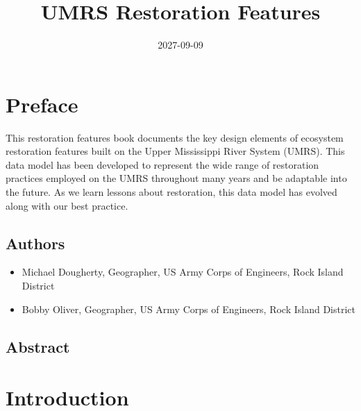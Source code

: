 \documentclass[
  letterpaper,
  DIV=11,
  numbers=noendperiod]{scrreprt}
\title{UMRS Restoration Features}
\author{}
\date{2027-09-09}
\providecommand{\tightlist}{%
  \setlength{\itemsep}{0pt}\setlength{\parskip}{0pt}}
\renewcommand*\contentsname{Table of contents}
\newcommand\contentsname{Table of contents}
\begin{document}
\maketitle

\renewcommand*\contentsname{Table of contents}
{
\setcounter{tocdepth}{2}
\tableofcontents
}


\chapter*{Preface}\label{preface}


This restoration features book documents the key design elements of
ecosystem restoration features built on the Upper Mississippi River
System (UMRS). This data model has been developed to represent the wide
range of restoration practices employed on the UMRS throughout many
years and be adaptable into the future. As we learn lessons about
restoration, this data model has evolved along with our best practice.

\section*{Authors}\label{authors}


\begin{itemize}
\tightlist
\item
  Michael Dougherty, Geographer, US Army Corps of Engineers, Rock Island
  District
\item
  Bobby Oliver, Geographer, US Army Corps of Engineers, Rock Island
  District
\end{itemize}

\section*{Abstract}\label{abstract}



\chapter{Introduction}\label{introduction}
\end{document}
